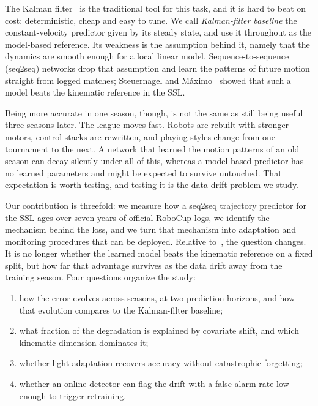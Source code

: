 \documentclass[runningheads]{llncs}
\begin{document}
The Kalman filter~\cite{kalman} is the traditional tool for this task, and it
is hard to beat on cost: deterministic, cheap and easy to tune. We call
\emph{Kalman-filter baseline} the constant-velocity predictor given by its
steady state, and use it throughout as the model-based reference. Its weakness
is the assumption behind it, namely that the dynamics are smooth enough for a
local linear model. Sequence-to-sequence (seq2seq) networks drop that
assumption and learn the patterns of future motion straight from logged
matches; Steuernagel and M\'aximo~\cite{seq2seq} showed that such a model beats
the kinematic reference in the SSL.

Being more accurate in one season, though, is not the same as still being
useful three seasons later. The league moves fast. Robots are rebuilt with
stronger motors, control stacks are rewritten, and playing styles change from
one tournament to the next. A network that learned the motion patterns of an
old season can decay silently under all of this, whereas a model-based
predictor has no learned parameters and might be expected to survive untouched.
That expectation is worth testing, and testing it is the data drift problem we
study.

Our contribution is threefold: we measure how a seq2seq trajectory predictor
for the SSL ages over seven years of official RoboCup logs, we identify the
mechanism behind the loss, and we turn that mechanism into adaptation and
monitoring procedures that can be deployed. Relative to~\cite{seq2seq}, the
question changes. It is no longer whether the learned model beats the kinematic
reference on a fixed split, but how far that advantage survives as the data
drift away from the training season. Four questions organize the study:

\begin{enumerate}
  \item how the error evolves across seasons, at two prediction horizons, and
        how that evolution compares to the Kalman-filter baseline;
  \item what fraction of the degradation is explained by covariate shift, and
        which kinematic dimension dominates it;
  \item whether light adaptation recovers accuracy without catastrophic
        forgetting;
  \item whether an online detector can flag the drift with a false-alarm rate
        low enough to trigger retraining.
\end{enumerate}
\end{document}
